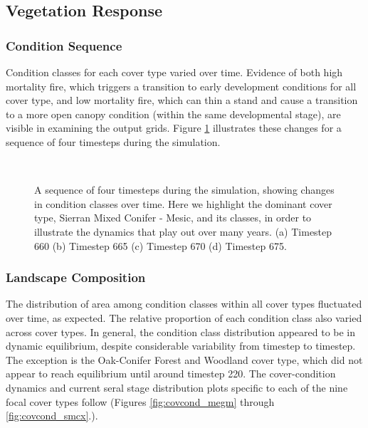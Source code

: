 \subsection{Vegetation Response}
\label{subsec:HRVvegresponse}

\subsubsection{Condition Sequence}

Condition classes for each cover type varied over time. Evidence of both high mortality fire, which triggers a transition to early development conditions for all cover type, and low mortality fire, which can thin a stand and cause a transition to a more open canopy condition (within the same developmental stage), are visible in examining the output grids. Figure \ref{fig:covcondmaps} illustrates these changes for a sequence of four timesteps during the simulation.
\begin{figure}[!htbp]
  \centering
  \\%
  \caption{A sequence of four timesteps during the simulation, showing changes in condition classes over time. Here we highlight the dominant cover type, Sierran Mixed Conifer - Mesic, and its classes, in order to illustrate the dynamics that play out over many years. (a) Timestep 660 (b) Timestep 665 (c) Timestep 670 (d) Timestep 675.}
  \label{fig:covcondmaps}
\end{figure}

\subsubsection{Landscape Composition}

The distribution of area among condition classes within all cover types fluctuated over time, as expected. The relative proportion of each condition class also varied across cover types. In general, the condition class distribution appeared to be in dynamic equilibrium, despite considerable variability from timestep to timestep. The exception is the Oak-Conifer Forest and Woodland cover type, which did not appear to reach equilibrium until around timestep 220. The cover-condition dynamics and current seral stage distribution plots specific to each of the nine focal cover types follow (Figures \ref{fig:covcond_megm} through \ref{fig:covcond_smcx}.).

